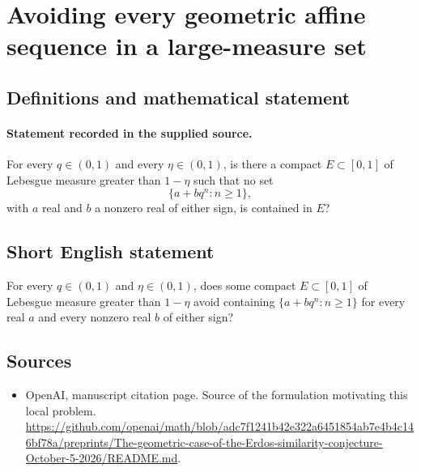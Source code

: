 \documentclass[11pt]{article}
\begin{document}
\section*{Avoiding every geometric affine sequence in a large-measure set}\label{30007428}
\subsection{Definitions and mathematical statement}
\paragraph{Statement recorded in the supplied source.}
For every $q\in(0,1)$ and every $\eta\in(0,1)$, is there a compact $E\subset[0,1]$ of Lebesgue measure greater than $1-\eta$ such that no set
\[
\{a+bq^n:n\geq1\},
\]
with $a$ real and $b$ a nonzero real of either sign, is contained in $E$?
\subsection{Short English statement}
For every $q\in(0,1)$ and $\eta\in(0,1)$, does some compact $E\subset[0,1]$ of Lebesgue measure greater than $1-\eta$ avoid containing $\{a+bq^n:n\geq1\}$ for every real $a$ and every nonzero real $b$ of either sign?
\subsection{Sources}
\begin{itemize}
\item[S1] OpenAI, manuscript citation page. Source of the formulation motivating this local problem.
\url{https://github.com/openai/math/blob/adc7f1241b42e322a6451854ab7e4b4c146bf78a/preprints/The-geometric-case-of-the-Erdos-similarity-conjecture-October-5-2026/README.md}.
\end{itemize}
\end{document}
